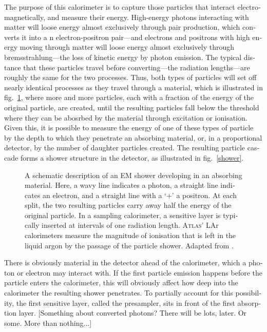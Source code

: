 \begin{english}
The purpose of this calorimeter is to capture those particles that interact electromagnetically, and measure their energy. High-energy photons interacting with matter will loose energy almost exclusively through pair production, which converts it into a n electron-positron pair---and electrons and positrons with high energy moving through matter will loose energy almost exclusively through bremsstrahlung---the loss of kinetic energy by photon emission. The typical distance that these particles travel before converting---the radiation lengths---are roughly the same for the two processes. Thus, both types of particles will set off nearly identical processes as they travel through a material, which is illustrated in fig.~\ref{emshower}, where more and more particles, each with a fraction of the energy of the original particle, are created, until the resulting particles fall below the threshold where they can be abosrbed by the material through excitation or ionisation. Given this, it is possible to measure the energy of one of these types of particle by the depth to which they penetrate an absorbing material, or, in a proportional detector, by the number of daughter particles created. The resulting particle cascade forms a shower structure in the detector, as illustrated in fig.~\ref{shower}.

\begin{figure}[htp]
\begin{minipage}[b]{.69\textwidth}
\begin{infilsf}\footnotesize

\end{infilsf}
\end{minipage}\hfill
\begin{minipage}[b]{.3\textwidth}
\caption{A schematic description of an EM shower developing in an absorbing material. Here, a wavy line indicates a photon, a straight line indicates an electron, and a straight line with a `$+$' a positron. At each split, the two resulting particles carry away half the energy of the original particle. In a sampling calorimeter, a sensitive layer is typically inserted at intervals of one radiation length. \textsc{Atlas}' LAr calorimeters measure the magnitude of ionisation that is left in the liquid argon by the passage of the particle shower. Adapted from \cite{fernow:sampcal}.
\label{emshower}
}
\end{minipage}
\end{figure}

There is obviously material in the detector ahead of the calorimeter, which a photon or electron may interact with. If the first particle emission happens before the particle enters the calorimeter, this will obviously affect how deep into the calorimeter the resulting shower penetrates. To partially account for this possibility, the first sensitive layer, called the presampler, sits in front of the first absorption layer. [Something about converted photons? There will be lots, later. Or some. More than nothing...]


\end{english}
